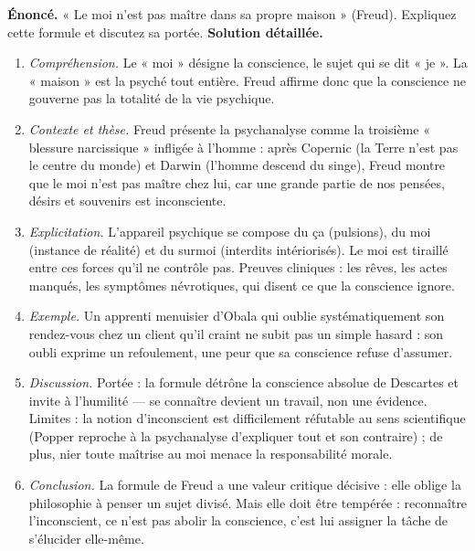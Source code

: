\documentclass[11pt]{article}
\newcommand{\cle}[1]{{\popxbold\color{popdark}#1}}
\begin{document}
\begin{exoresolu}
\textbf{Énoncé.} « Le moi n'est pas maître dans sa propre maison » (Freud). Expliquez cette formule et discutez sa portée.
\tcblower
\textbf{Solution détaillée.}
\begin{enumerate}
\item \emph{Compréhension.} Le « \cle{moi} » désigne la conscience, le sujet qui se dit « je ». La « maison » est la psyché tout entière. Freud affirme donc que la conscience ne gouverne pas la totalité de la vie psychique.
\item \emph{Contexte et thèse.} Freud présente la psychanalyse comme la troisième « blessure narcissique » infligée à l'homme : après Copernic (la Terre n'est pas le centre du monde) et Darwin (l'homme descend du singe), Freud montre que le moi n'est pas maître chez lui, car une grande partie de nos pensées, désirs et souvenirs est inconsciente.
\item \emph{Explicitation.} L'appareil psychique se compose du \cle{ça} (pulsions), du \cle{moi} (instance de réalité) et du \cle{surmoi} (interdits intériorisés). Le moi est tiraillé entre ces forces qu'il ne contrôle pas. Preuves cliniques : les rêves, les actes manqués, les symptômes névrotiques, qui disent ce que la conscience ignore.
\item \emph{Exemple.} Un apprenti menuisier d'Obala qui oublie systématiquement son rendez-vous chez un client qu'il craint ne subit pas un simple hasard : son oubli exprime un refoulement, une peur que sa conscience refuse d'assumer.
\item \emph{Discussion.} Portée : la formule détrône la conscience absolue de Descartes et invite à l'humilité — se connaître devient un travail, non une évidence. Limites : la notion d'inconscient est difficilement réfutable au sens scientifique (Popper reproche à la psychanalyse d'expliquer tout et son contraire) ; de plus, nier toute maîtrise au moi menace la responsabilité morale.
\item \emph{Conclusion.} La formule de Freud a une valeur critique décisive : elle oblige la philosophie à penser un sujet divisé. Mais elle doit être tempérée : reconnaître l'inconscient, ce n'est pas abolir la conscience, c'est lui assigner la tâche de s'élucider elle-même.
\end{enumerate}
\end{exoresolu}
\end{document}

